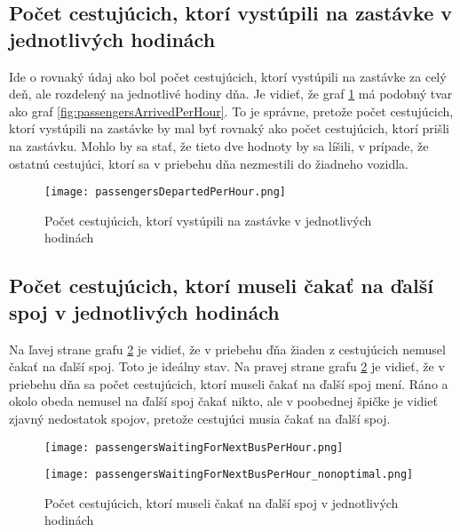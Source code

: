\subsection*{Počet cestujúcich, ktorí vystúpili na zastávke v jednotlivých hodinách}
Ide o rovnaký údaj ako bol počet cestujúcich, ktorí vystúpili na zastávke za celý deň, ale rozdelený na jednotlivé hodiny dňa.
Je vidieť, že graf \ref{fig:passengersDepartedPerHour} má podobný tvar ako graf \ref{fig:passengersArrivedPerHour}.
To je správne, pretože počet cestujúcich, ktorí vystúpili na zastávke by mal byť rovnaký ako počet cestujúcich, ktorí prišli na zastávku.
Mohlo by sa stať, že tieto dve hodnoty by sa líšili, v prípade, že ostatnú cestujúci, ktorí sa v priebehu dňa nezmestili do žiadneho vozidla.
\begin{figure}[h]
  \label{fig:passengersDepartedPerHour}
  \centering
  \texttt{[image: passengersDepartedPerHour.png]}
  \caption{Počet cestujúcich, ktorí vystúpili na zastávke v jednotlivých hodinách}
\end{figure}

\subsection*{Počet cestujúcich, ktorí museli čakať na ďalší spoj v jednotlivých hodinách}
Na ľavej strane grafu \ref{fig:passengersWaitingForNextBusPerHour} je vidieť, že v priebehu ďňa žiaden z cestujúcich nemusel čakať na ďalší spoj.
Toto je ideálny stav.
Na pravej strane grafu \ref{fig:passengersWaitingForNextBusPerHour} je vidieť, že v priebehu dňa sa počet cestujúcich, ktorí museli čakať na ďalší spoj mení.
Ráno a okolo obeda nemusel na ďalší spoj čakať nikto, ale v poobednej špičke je vidieť zjavný nedostatok spojov, pretože cestujúci musia čakať na ďalší spoj.
\begin{figure}[h]
  \label{fig:passengersWaitingForNextBusPerHour}
  \centering
  \begin{minipage}{0.49\textwidth}
    \texttt{[image: passengersWaitingForNextBusPerHour.png]}
  \end{minipage}
  \begin{minipage}{0.49\textwidth}
    \texttt{[image: passengersWaitingForNextBusPerHour\_nonoptimal.png]}
  \end{minipage}
  \caption{Počet cestujúcich, ktorí museli čakať na ďalší spoj v jednotlivých hodinách}
\end{figure}

